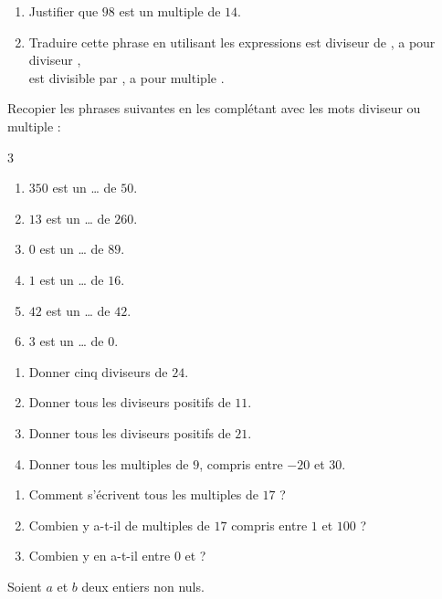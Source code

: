 
\exo

\begin{enumerate}
\item Justifier que $98$ est un multiple de $14$.
\item Traduire cette phrase en utilisant les expressions \og est diviseur de \fg{}, \og a pour diviseur \fg{},\\ \og est divisible par \fg{}, \og a pour multiple \fg{}.
\end{enumerate}

\exo

Recopier les phrases suivantes en les complétant avec les mots \og diviseur \fg{} ou \og multiple \fg{} :
\setlength{\columnsep}{1cm}
\setlength{\columnseprule}{0pt}
\begin{multicols}{3}
\begin{enumerate}
\item $350$ est un \dots{} de $50$.
\item $13$ est un \dots{} de $260$.
\item $0$ est un \dots{} de $89$.
\item $1$ est un \dots{} de $16$.
\item $42$ est un \dots{} de $42$.
\item $3$ est un \dots{} de $0$.
\end{enumerate}
\end{multicols}

\exo

\begin{enumerate}
\item Donner cinq diviseurs de $24$.
\item Donner tous les diviseurs positifs de $11$.
\item Donner tous les diviseurs positifs de $21$.
\item Donner tous les multiples de $9$, compris entre $-20$ et $30$.
\end{enumerate}

\exo

\begin{enumerate}
\item Comment s'écrivent tous les multiples de $17$ ?
\item Combien y a-t-il de multiples de $17$ compris entre $1$ et $100$ ?
\item Combien y en a-t-il entre $0$ et  ?
\end{enumerate}

\exo

Soient $a$ et $b$ deux entiers non nuls.

